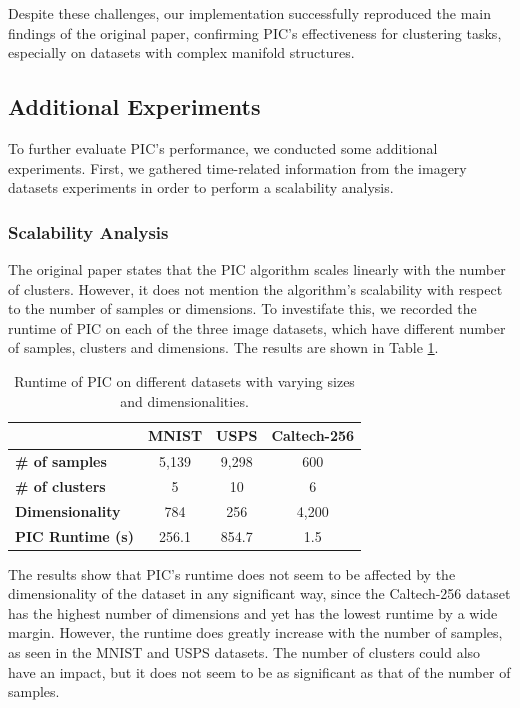 Despite these challenges, our implementation successfully reproduced the main findings of the original paper, confirming PIC's effectiveness for clustering tasks, especially on datasets with complex manifold structures.

\subsection{Additional Experiments}
To further evaluate PIC's performance, we conducted some additional experiments. First, we gathered time-related information from the imagery datasets experiments in order to perform a scalability analysis.

\subsubsection{Scalability Analysis}
The original paper states that the PIC algorithm scales linearly with the number of clusters. However, it does not mention the algorithm's scalability with respect to the number of samples or dimensions. To investifate this, we recorded the runtime of PIC on each of the three image datasets, which have different number of samples, clusters and dimensions. The results are shown in Table \ref{table:time}.

\begin{table}[h]
    \centering
    \begin{tabular}{|l|c|c|c|}
    \hline
     & \textbf{MNIST} & \textbf{USPS} & \textbf{Caltech-256} \\
    \hline
    \textbf{\# of samples} & 5,139 & 9,298 & 600 \\ \hline
    \textbf{\# of clusters} & 5 & 10 & 6 \\ \hline
    \textbf{Dimensionality} & 784 & 256 & 4,200 \\ \hline
    \textbf{PIC Runtime (s)} & 256.1 & 854.7 & 1.5 \\ \hline
    \end{tabular}
    \caption{Runtime of PIC on different datasets with varying sizes and dimensionalities.}
    \label{table:time}
\end{table}

The results show that PIC's runtime does not seem to be affected by the dimensionality of the dataset in any significant way, since the Caltech-256 dataset has the highest number of dimensions and yet has the lowest runtime by a wide margin. However, the runtime does greatly increase with the number of samples, as seen in the MNIST and USPS datasets. The number of clusters could also have an impact, but it does not seem to be as significant as that of the number of samples.

